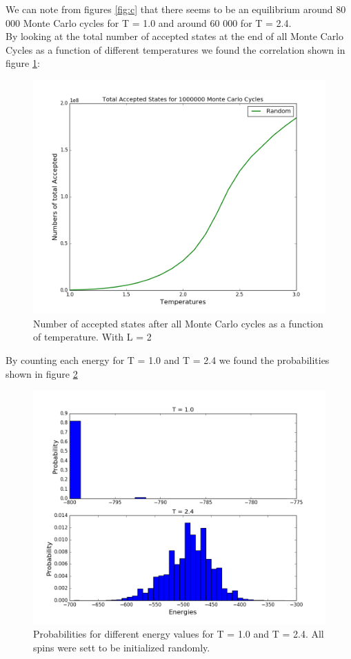 \documentclass{article}
\begin{document}
We can note from figures \ref{fig:c} that there seems to be an equilibrium around 80 000 Monte Carlo cycles for T = 1.0 and around 60 000 for T = 2.4. \\
By looking at the total number of accepted states at the end of all Monte Carlo Cycles as a function of different temperatures we found the correlation shown in figure \ref{fig:cAcc}:
\begin{figure}[H]
\centering
\includegraphics[scale=0.3]{../figures/task_c/accepted.png}
\caption{Number of accepted states after all Monte Carlo cycles as a function of temperature. With L = 2}
\label{fig:cAcc}
\end{figure}
By counting each energy for T = 1.0 and T = 2.4 we found the probabilities shown in figure \ref{fig:cProb}
\begin{figure}[H]
\centering
\includegraphics[scale=0.5]{../figures/task_d/hist1.png}
\caption{Probabilities for different energy values for T = 1.0 and T = 2.4. All spins were sett to be initialized randomly.}
\label{fig:cProb}
\end{figure}
\end{document}
